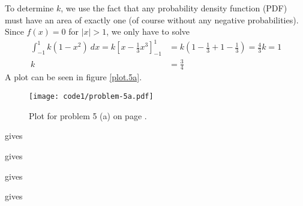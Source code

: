 \documentclass[a4paper,english,12pt]{article}
\begin{document}
To determine $k$, we use the fact that any probability density function (PDF)
must have an area of exactly one (of course without any negative
probabilities). Since $f(x) = 0$ for $|x| > 1$, we only have to solve
\begin{align*}
  \int_{-1}^{1}{k(1-x^2)~dx} =
  k\left[ x - \frac{1}{3}{x^3} \right]_{-1}^{1} &=
  k\left( 1 - \frac{1}{3} + 1 - \frac{1}{3} \right) = \frac{4}{3}k = 1 \\
   k &= \frac{3}{4}
\end{align*}
A plot can be seen in figure \vref{plot.5a}.
\begin{figure}[H]
  \texttt{[image: code1/problem-5a.pdf]}
  \caption{Plot for problem 5 (a) on page \pageref{problem.5 (a)}.}
  \label{plot.5a}
\end{figure}






\texttt{} gives
\texttt{}

\texttt{} gives
\texttt{}

 gives
\texttt{}

\texttt{} gives
\texttt{}

\end{document}
